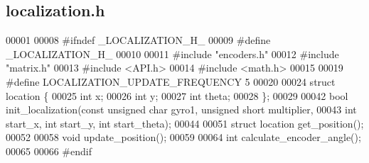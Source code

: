 \subsection{localization.\+h}
\label{localization_8h_source}

\begin{DoxyCode}
00001 
00008 \textcolor{preprocessor}{#ifndef \_LOCALIZATION\_H\_}
00009 \textcolor{preprocessor}{#define \_LOCALIZATION\_H\_}
00010 
00011 \textcolor{preprocessor}{#include "encoders.h"}
00012 \textcolor{preprocessor}{#include "matrix.h"}
00013 \textcolor{preprocessor}{#include <API.h>}
00014 \textcolor{preprocessor}{#include <math.h>}
00015 
00019 \textcolor{preprocessor}{#define LOCALIZATION\_UPDATE\_FREQUENCY 5}
00020 
00024 \textcolor{keyword}{struct }location \{
00025   \textcolor{keywordtype}{int} x;
00026   \textcolor{keywordtype}{int} y;
00027   \textcolor{keywordtype}{int} theta;
00028 \};
00029 
00042 \textcolor{keywordtype}{bool} init_localization(\textcolor{keyword}{const} \textcolor{keywordtype}{unsigned} \textcolor{keywordtype}{char} gyro1, \textcolor{keywordtype}{unsigned} \textcolor{keywordtype}{short} multiplier,
00043                        \textcolor{keywordtype}{int} start\_x, \textcolor{keywordtype}{int} start\_y, \textcolor{keywordtype}{int} start\_theta);
00044 
00051 \textcolor{keyword}{struct }location get_position();
00052 
00058 \textcolor{keywordtype}{void} update_position();
00059 
00064 \textcolor{keywordtype}{int} calculate_encoder_angle();
00065 
00066 \textcolor{preprocessor}{#endif}
\end{DoxyCode}
